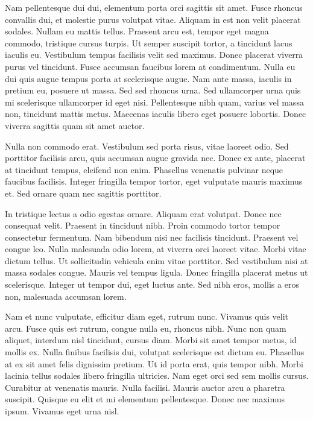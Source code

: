 \documentclass{homework}
\begin{document}
Nam pellentesque dui dui, elementum porta orci sagittis sit amet. Fusce rhoncus convallis dui, et molestie purus volutpat vitae. Aliquam in est non velit placerat sodales. Nullam eu mattis tellus. Praesent arcu est, tempor eget magna commodo, tristique cursus turpis. Ut semper suscipit tortor, a tincidunt lacus iaculis eu. Vestibulum tempus facilisis velit sed maximus. Donec placerat viverra purus vel tincidunt. Fusce accumsan faucibus lorem at condimentum. Nulla eu dui quis augue tempus porta at scelerisque augue. Nam ante massa, iaculis in pretium eu, posuere ut massa. Sed sed rhoncus urna. Sed ullamcorper urna quis mi scelerisque ullamcorper id eget nisi. Pellentesque nibh quam, varius vel massa non, tincidunt mattis metus. Maecenas iaculis libero eget posuere lobortis. Donec viverra sagittis quam sit amet auctor.

Nulla non commodo erat. Vestibulum sed porta risus, vitae laoreet odio. Sed porttitor facilisis arcu, quis accumsan augue gravida nec. Donec ex ante, placerat at tincidunt tempus, eleifend non enim. Phasellus venenatis pulvinar neque faucibus facilisis. Integer fringilla tempor tortor, eget vulputate mauris maximus et. Sed ornare quam nec sagittis porttitor.

In tristique lectus a odio egestas ornare. Aliquam erat volutpat. Donec nec consequat velit. Praesent in tincidunt nibh. Proin commodo tortor tempor consectetur fermentum. Nam bibendum nisi nec facilisis tincidunt. Praesent vel congue leo. Nulla malesuada odio lorem, at viverra orci laoreet vitae. Morbi vitae dictum tellus. Ut sollicitudin vehicula enim vitae porttitor. Sed vestibulum nisi at massa sodales congue. Mauris vel tempus ligula. Donec fringilla placerat metus ut scelerisque. Integer ut tempor dui, eget luctus ante. Sed nibh eros, mollis a eros non, malesuada accumsan lorem.

Nam et nunc vulputate, efficitur diam eget, rutrum nunc. Vivamus quis velit arcu. Fusce quis est rutrum, congue nulla eu, rhoncus nibh. Nunc non quam aliquet, interdum nisl tincidunt, cursus diam. Morbi sit amet tempor metus, id mollis ex. Nulla finibus facilisis dui, volutpat scelerisque est dictum eu. Phasellus at ex sit amet felis dignissim pretium. Ut id porta erat, quis tempor nibh. Morbi lacinia tellus sodales libero fringilla ultricies. Nam eget orci sed sem mollis cursus. Curabitur at venenatis mauris. Nulla facilisi. Mauris auctor arcu a pharetra suscipit. Quisque eu elit et mi elementum pellentesque. Donec nec maximus ipsum. Vivamus eget urna nisl.
\end{document}
